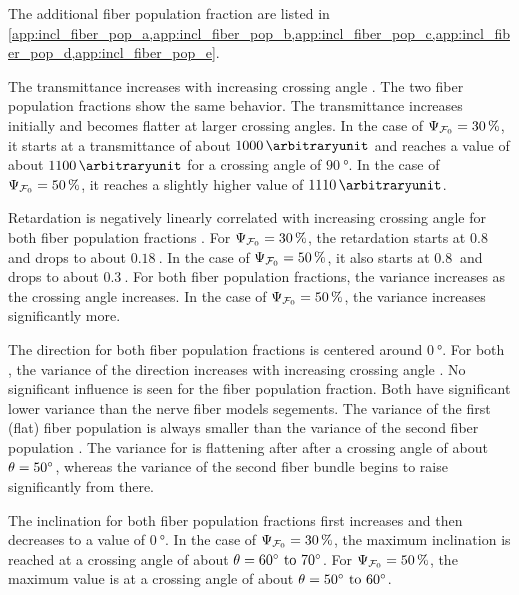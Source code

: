 The additional fiber population fraction are listed in \cref{app:incl_fiber_pop_a,app:incl_fiber_pop_b,app:incl_fiber_pop_c,app:incl_fiber_pop_d,app:incl_fiber_pop_e}.
\par
The transmittance increases with increasing crossing angle \modelOmega{}.
The two fiber population fractions \modelPsi{} show the same behavior.
The transmittance increases initially and becomes flatter at larger crossing angles.
In the case of $\textnormal{$\Psi_{\textnormal{$\mathcal{F}_0$}}$} = \SI{30}{\percent}$, it starts at a transmittance of about $\SI{1000}{\arbitraryunit}$ and reaches a value of about $\SI{1100}{\arbitraryunit}$ for a crossing angle of $\SI{90}{\degree}$.
In the case of $\textnormal{$\Psi_{\textnormal{$\mathcal{F}_0$}}$} = \SI{50}{\percent}$, it reaches a slightly higher value of $\SI{1110}{\arbitraryunit}$.
\par
Retardation is negatively linearly correlated with increasing crossing angle for both fiber population fractions \modelPsi{}.
For $\textnormal{$\Psi_{\textnormal{$\mathcal{F}_0$}}$}=\SI{30}{\percent}$, the retardation starts at $\SI{0.8}{}$ and drops to about $\SI{0.18}{}$.
In the case of $\textnormal{$\Psi_{\textnormal{$\mathcal{F}_0$}}$}=\SI{50}{\percent}$, it also starts at $\SI{0.8}{}$ and drops to about $\SI{0.3}{}$.
For both fiber population fractions, the variance increases as the crossing angle increases.
In the case of $\textnormal{$\Psi_{\textnormal{$\mathcal{F}_0$}}$}=\SI{50}{\percent}$, the variance increases significantly more.
\par
The direction for both fiber population fractions \modelPsi{} is centered around $\SI{0}{\degree}$.
For both \modelPsi{}, the variance of the direction increases with increasing crossing angle \modelOmega{}.
No significant influence is seen for the fiber population fraction.
Both \modelPsi{} have significant lower variance than the nerve fiber models segements.
The \bvariance{} variance of the first (flat) fiber population \popa{} is always smaller than the \bvariance{} variance of the second fiber population \popb{}.
The \bvariance{} variance for \popa{} is flattening after after a crossing angle of about $\textnormal{$\theta$} = \SI{50}{\degree}$, whereas the \bvariance{} variance of the second fiber bundle begins to raise significantly from there.
\par
The inclination for both fiber population fractions first increases and then decreases to a value of $\SI{0}{\degree}$.
In the case of $\textnormal{$\Psi_{\textnormal{$\mathcal{F}_0$}}$}=\SI{30}{\percent}$, the maximum inclination is reached at a crossing angle of about $\modelOmega=\SIrange{60}{70}{\degree}$.
For $\textnormal{$\Psi_{\textnormal{$\mathcal{F}_0$}}$}=\SI{50}{\percent}$, the maximum value is at a crossing angle of about $\modelOmega=\SIrange{50}{60}{\degree}$.
